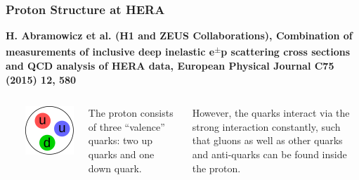\documentclass[10pt,t]{beamer}
\begin{document}
\begin{frame}
\frametitle{Proton Structure at HERA}
\vspace*{-2.6\baselineskip}
\alert{\bfseries\footnotesize H. Abramowicz et al. (H1 and ZEUS Collaborations), Combination of measurements of inclusive deep inelastic e\textsuperscript{$\pm$}p scattering cross sections and QCD analysis of HERA data, European Physical Journal C75 (2015) 12, 580}
\vspace*{\baselineskip}
\begin{columns}
~\\[-\baselineskip]
\begin{minipage}[c]{0.3\textwidth}
    \includegraphics[width=\textwidth]{hera-proton1}
\end{minipage}
\hfill
\begin{minipage}[c]{0.65\textwidth}\raggedright
    The proton consists of three ``valence'' quarks: two up quarks and one down quark.
\end{minipage}\vspace*{1ex}

However, the quarks interact via the strong interaction constantly, such that gluons as well as other quarks and anti-quarks can be found inside the proton.


\end{columns}
\end{frame}
\end{document}
